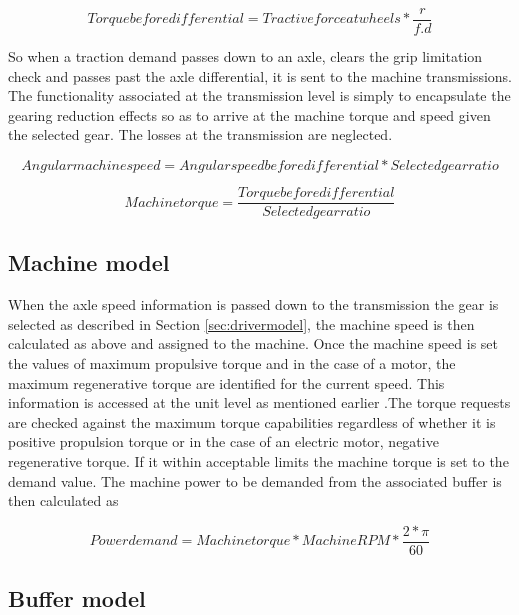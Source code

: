 \documentclass[ExampleMasters.tex]{subfiles}
\begin{document}
\begin{equation} \label{eq:axletorquegearing}
Torque before differential =Tractive force at wheels*\frac{r}{f.d} 
\end{equation}

 So when a traction demand passes down to an axle, clears the grip limitation check and passes past the axle differential, it is sent to the machine transmissions. The functionality associated at the transmission level is simply to encapsulate the gearing reduction effects so as to arrive at the machine torque and speed given the selected gear. The losses at the transmission are neglected. 

\begin{equation} \label{eq:transpeedgearing}
Angular machine speed =Angular speed before differential*Selected gear ratio
\end{equation}

\begin{equation} \label{eq:transtorquegearing}
Machine torque =\frac{Torque before differential}{Selected gear ratio}
\end{equation}

\subsection{Machine model}
\label{sec:machinemodel}

When the axle speed information is passed down to the transmission the gear is selected as described in Section \ref{sec:drivermodel}, the machine speed is then calculated as above and assigned to the machine. Once the machine speed is set the values of maximum propulsive torque and in the case of a motor, the maximum regenerative torque are identified for the current speed. This information is accessed at the unit level as mentioned earlier .The torque requests are checked against the maximum torque capabilities regardless of whether it is positive propulsion torque or in the case of an electric motor, negative regenerative torque. If it within acceptable limits the machine torque is set to the demand value. The machine power to be demanded from the associated buffer is then calculated as 

\begin{equation} \label{eq:machinepowerdem}
Power demand=Machine torque*MachineRPM*\frac{2*\pi}{60}
\end{equation}

\subsection{Buffer model}
\label{sec:machinemodel}
\end{document}
